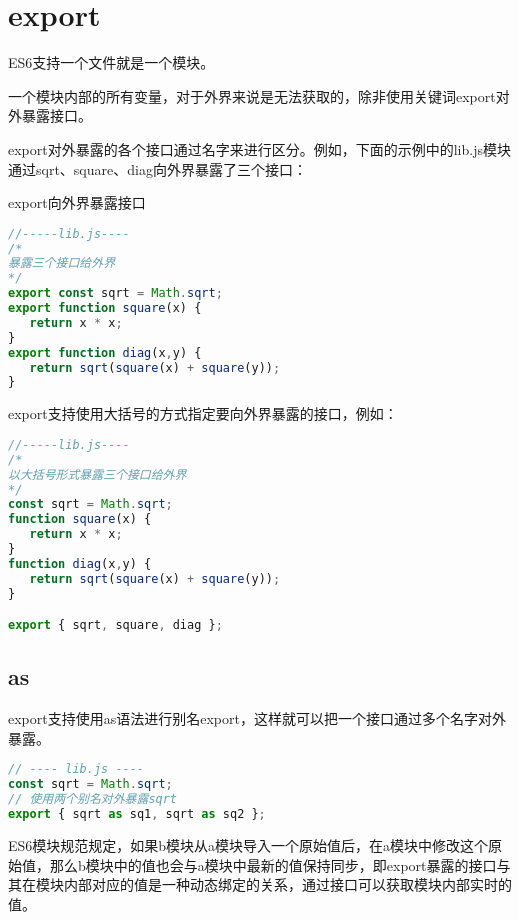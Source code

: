 \section{export}

ES6支持一个文件就是一个模块。

一个模块内部的所有变量，对于外界来说是无法获取的，除非使用关键词export对外暴露接口。

export对外暴露的各个接口通过名字来进行区分。例如，下面的示例中的lib.js模块通过sqrt、square、diag向外界暴露了三个接口：



\begin{example}
export向外界暴露接口
\begin{lstlisting}[language=JavaScript]
//-----lib.js----
/*
暴露三个接口给外界
*/
export const sqrt = Math.sqrt;
export function square(x) {
   return x * x;
}
export function diag(x,y) {
   return sqrt(square(x) + square(y));
}
\end{lstlisting}
\end{example}

export支持使用大括号的方式指定要向外界暴露的接口，例如：






\begin{lstlisting}[language=JavaScript]
//-----lib.js----
/*
以大括号形式暴露三个接口给外界
*/
const sqrt = Math.sqrt;
function square(x) {
   return x * x;
}
function diag(x,y) {
   return sqrt(square(x) + square(y));
}

export { sqrt, square, diag };
\end{lstlisting}

\subsection{as}


export支持使用as语法进行别名export，这样就可以把一个接口通过多个名字对外暴露。

\begin{lstlisting}[language=JavaScript]
// ---- lib.js ----
const sqrt = Math.sqrt;
// 使用两个别名对外暴露sqrt
export { sqrt as sq1, sqrt as sq2 };
\end{lstlisting}

ES6模块规范规定，如果b模块从a模块导入一个原始值后，在a模块中修改这个原始值，那么b模块中的值也会与a模块中最新的值保持同步，即export暴露的接口与其在模块内部对应的值是一种动态绑定的关系，通过接口可以获取模块内部实时的值。


